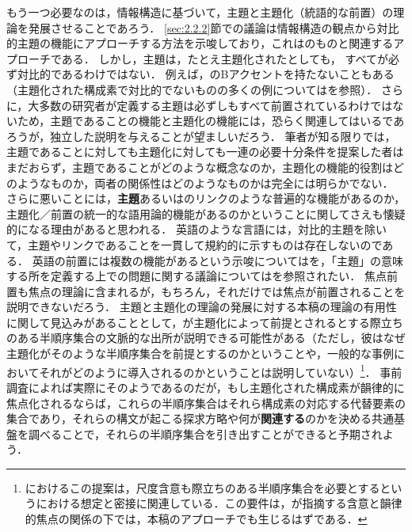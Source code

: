 \documentclass{goken}
\newcommand{\ori}[1]{\noindent\textcolor[gray]{0.7}{\fontsize{8pt}{8pt}\selectfont{\textsf{(p.~#1)}}} }
\begin{document}
もう一つ必要なのは，情報構造に基づいて，主題と主題化（統語的な前置）の理論を発展させることであろう．
\ref{sec:2.2.2}節での議論は情報構造の観点から対比的主題の機能にアプローチする方法を示唆しており，これは\citet{Buring1999}のものと関連するアプローチである．
しかし，主題は，たとえ主題化されたとしても，\ori{62}すべてが必ず対比的であるわけではない．
例えば，\citet{Jackendoff1972}のBアクセントを持たないこともある（主題化された構成素で対比的でないものの多くの例については\citet{Ward1985}を参照）．
さらに，大多数の研究者が定義する主題は必ずしもすべて前置されているわけではないため，主題であることの機能と主題化の機能には，恐らく関連してはいるであろうが，独立した説明を与えることが望ましいだろう．
筆者が知る限りでは，主題であることに対しても主題化に対しても一連の必要十分条件を提案した者はまだおらず，主題であることがどのような概念なのか，主題化の機能的役割はどのようなものか，両者の関係性はどのようなものかは完全には明らかでない．
さらに悪いことには，\textbf{主題}あるいは\citet{Vallduvi1993}のリンクのような普遍的な機能があるのか，主題化／前置の統一的な語用論的機能があるのかということに関してさえも懐疑的になる理由があると思われる．
英語のような言語には，対比的主題を除いて，主題やリンクであることを一貫して規約的に示すものは存在しないのである．
英語の前置には複数の機能があるという示唆については\citealt{CulicoverRochemont1983}を，「主題」の意味する所を定義する上での問題に関する議論については\citet{McNally1998}を参照されたい．
焦点前置も焦点の理論に含まれるが，もちろん，それだけでは焦点が前置されることを説明できないだろう．
主題と主題化の理論の発展に対する本稿の理論の有用性に関して見込みがあることとして，\citet{Ward1985}が主題化によって前提とされるとする際立ちのある半順序集合の文脈的な出所が説明できる可能性がある（ただし，彼はなぜ主題化がそのような半順序集合を前提とするのかということや，一般的な事例においてそれがどのように導入されるのかということは説明していない）\footnote{%
\citealt{Ward1985}におけるこの提案は，尺度含意も際立ちのある半順序集合を必要とするという\citealt{Hirschberg1985}における想定と密接に関連している．この要件は，\citealt{Rooth1992a}が指摘する含意と韻律的焦点の関係の下では，本稿のアプローチでも生じるはずである．
}．
事前調査によれば実際にそのようであるのだが，もし主題化された構成素が韻律的に焦点化されるならば，これらの半順序集合はそれら構成素の対応する代替要素の集合であり，それらの構文が起こる探求方略や何が\textbf{関連する}のかを決める共通基盤を調べることで，それらの半順序集合を引き出すことができると予期されよう．
\end{document}
